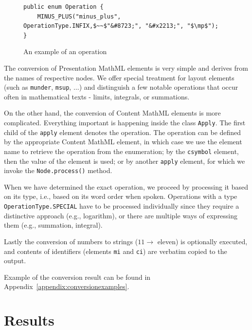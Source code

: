 \documentclass[11pt,oneside,final]{fithesis2}
\begin{document}
\begin{figure}[!ht]
\begin{lstlisting}[mathescape=true]
public enum Operation {
	MINUS_PLUS("minus_plus", OperationType.INFIX,$~~$"&#8723;", "&#x2213;", "$\mp$");
}
\end{lstlisting}
\caption{An example of an operation}
\label{fig:converter-operation}
\end{figure}

The conversion of Presentation MathML elements is very simple and derives from the names of respective nodes. We offer special treatment for layout elements (such as \texttt{munder}, \texttt{msup}, $\ldots$) and distinguish a few notable operations that occur often in mathematical texts - limits, integrals, or summations. 

On the other hand, the conversion of Content MathML elements is more complicated. Everything important is happening inside the class \texttt{Apply}. The first child of the \texttt{apply} element denotes the operation. The operation can be defined by the appropriate Content MathML element, in which case we use the element name to retrieve the operation from the enumeration; by the \texttt{csymbol} element, then the value of the element is used; or by another \texttt{apply} element, for which we invoke the \texttt{Node.process()} method. 

When we have determined the exact operation, we proceed by processing it based on its type, i.e., based on its word order when spoken. Operations with a type \texttt{OperationType.SPECIAL} have to be processed individually since they require a distinctive approach (e.g., logarithm), or there are multiple ways of expressing them (e.g., summation, integral).

Lastly the conversion of numbers to strings ($11 \rightarrow$ eleven) is optionally executed, and contents of identifiers (elements \texttt{mi} and \texttt{ci}) are verbatim copied to the output. 

Example of the conversion result can be found in Appendix~\ref{appendix:conversionexamples}.

\chapter{Results}
\end{document}
